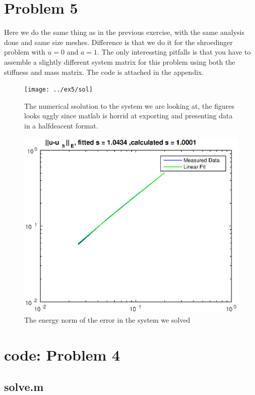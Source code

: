 \documentclass[11pt]{article}
\begin{document}
\section{Problem 5}
Here we do the same thing as in the previous exercise, with the same analysis done and same size meshes. Difference is that we do it for the shroedinger problem with $u=0$ and $a=1$. The only interessting pitfalls is that you have to assemble a slightly different system matrix for this problem using both the stiffness and mass matrix. The code is attached in the appendix.

\begin{figure}[H]
	\centering
	\texttt{[image: ../ex5/sol]}
	\caption{The numerical ssolution to the system we are looking at, the figures looks uggly since matlab is horrid at exporting and presenting data in a halfdeacent format.}
	\label{fig:ex5sol}
\end{figure}
\begin{figure}[H]
	\centering
	\includegraphics[width=1\textwidth]{../ex5/error}
	\caption{The energy norm of the error in the system we solved}
	\label{fig:ex5error}
\end{figure}

\newpage
\appendix
\section{code: Problem 4}
\subsection{solve.m}
\end{document}
